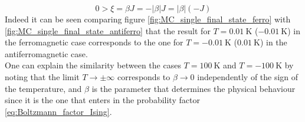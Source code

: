 \begin{equation*}
    0 > \xi = \beta J = -|\beta| J = |\beta| (-J)
\end{equation*}
Indeed it can be seen comparing figure \ref{fig:MC_single_final_state_ferro} with \ref{fig:MC_single_final_state_antiferro} that the result for $T = \SI{0.01}{\kelvin}$ ($-\SI{0.01}{\kelvin}$) in the ferromagnetic case corresponds to the one for $T = - \SI{0.01}{\kelvin}$ ($\SI{0.01}{\kelvin}$) in the antiferromagnetic case. \\
One can explain the similarity between the cases $T = \SI{100}{\kelvin}$ and $T = \SI{-100}{\kelvin}$ by noting that the limit $T \to \pm \infty$ corresponds to $\beta \to 0$ independently of the sign of the temperature, and $\beta$ is the parameter that determines the physical behaviour since it is the one that enters in the probability factor \ref{eq:Boltzmann_factor_Ising}.


